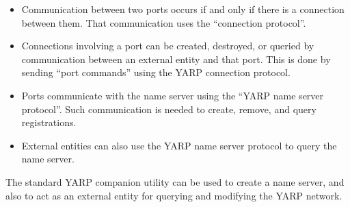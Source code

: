 \begin{itemize} \pflist

\item Communication between two ports occurs if and only if there
is a connection between them.  That communication uses the
``connection protocol''.

\item Connections involving a port can be created, destroyed, or
queried by communication between an external entity and that port.
This is done by sending ``port commands'' using the YARP
connection protocol.

\item Ports communicate with the name server using the 
``YARP name server protocol''.  Such communication is needed
to create, remove, and query registrations.

\item External entities can also use the YARP name server protocol
to query the name server.

\end{itemize}

\noindent
The standard YARP companion utility can be used to create a
name server, and also to act as an external entity for querying and
modifying the YARP network.

